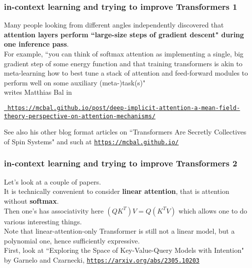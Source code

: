\documentclass{beamer}
\begin{document}
\begin{frame}

  \frametitle{in-context learning and trying to improve Transformers 1}

Many people looking from different angles independently discovered that {\bf attention layers perform
``large-size steps of gradient descent" during one inference pass}.\\[2ex]

For example, {\footnotesize``you can think of softmax attention as implementing a single, big gradient step of some energy function and that training transformers is akin to meta-learning how to best tune a stack of attention and feed-forward modules to perform well on some auxiliary (meta-)task(s)"}\\ 
writes Matthias Bal in

\begin{minipage}{\linewidth}
\hspace{-0.2in}
\href{https://mcbal.github.io/post/deep-implicit-attention-a-mean-field-theory-perspective-on-attention-mechanisms/}{\tt\tiny 
https://mcbal.github.io/post/deep-implicit-attention-a-mean-field-theory-perspective-on-attention-mechanisms/}
\end{minipage}

See also his other blog format articles on ``Transformers Are Secretly Collectives of Spin Systems" and such at
\href{https://mcbal.github.io/}{\tt\small https://mcbal.github.io/}

\end{frame}

\begin{frame}

  \frametitle{in-context learning and trying to improve Transformers 2}

Let's look at a couple of papers.\\[2ex]

It is technically convenient to consider {\bf linear attention}, that is attention without {\bf softmax}.\\[2ex]

Then one's has associativity here $(QK^T)V = Q(K^TV)$ which allows one to do various interesting things.\\[2ex]

Note that linear-attention-only Transformer is still not a linear model, but a polynomial one, hence
sufficiently expressive.\\[2ex]

First, look at ``Exploring the Space of Key-Value-Query Models with Intention" by Garnelo and Czarnecki,
\href{https://arxiv.org/abs/2305.10203}{\tt\small https://arxiv.org/abs/2305.10203} 


\end{frame}
\end{document}
